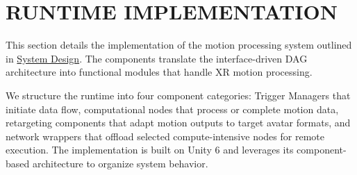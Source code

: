 \section{RUNTIME IMPLEMENTATION}\label{sec:implementation}

This section details the implementation of the motion processing system outlined in \hyperref[sec:systemdesign]{System Design}.
The components translate the interface-driven DAG architecture into functional modules that handle XR motion processing.

We structure the runtime into four component categories: Trigger Managers that initiate data flow, computational nodes that process or complete motion data, retargeting components that adapt motion outputs to target avatar formats, and network wrappers that offload selected compute-intensive nodes for remote execution.
The implementation is built on Unity 6 and leverages its component-based architecture to organize system behavior.





